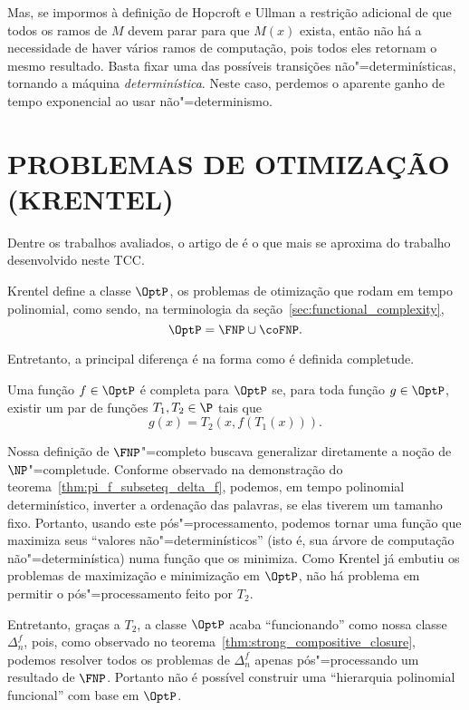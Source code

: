 Mas,
se impormos à definição de Hopcroft e Ullman a restrição adicional
de que todos os ramos de $M$ devem parar para que $M(x)$ exista,
então não há a necessidade de haver vários ramos de computação,
pois todos eles retornam o mesmo resultado.
Basta fixar uma das possíveis transições não"=determinísticas,
tornando a máquina \emph{determinística}.
Neste caso,
perdemos o aparente ganho de tempo exponencial ao usar não"=determinismo.

\section{PROBLEMAS DE OTIMIZAÇÃO (KRENTEL)}

Dentre os trabalhos avaliados,
o artigo de 
é o que mais se aproxima do trabalho desenvolvido neste TCC.

Krentel define a classe $\OptP$,
os problemas de otimização que rodam em tempo polinomial,
como sendo,
na terminologia da seção~\ref{sec:functional_complexity},
\begin{equation*}
    \OptP = \FNP \cup \coFNP.
\end{equation*}

Entretanto,
a principal diferença é na forma como é definida completude.
\begin{definition}
    Uma função $f \in \OptP$ é completa para $\OptP$
    se, para toda função $g \in \OptP$,
    existir um par de funções $T_1, T_2 \in \P$
    tais que
    \begin{equation*}
        g(x) = T_2( x, f(T_1(x)) ).
    \end{equation*}
\end{definition}

Nossa definição de $\FNP$"=completo
buscava generalizar diretamente a noção de $\NP$"=completude.
Conforme observado na demonstração do teorema~\ref{thm:pi_f_subseteq_delta_f},
podemos, em tempo polinomial determinístico,
inverter a ordenação das palavras, se elas tiverem um tamanho fixo.
Portanto,
usando este pós"=processamento,
podemos tornar uma função que maximiza seus ``valores não"=determinísticos''
(isto é, sua árvore de computação não"=determinística)
numa função que os minimiza.
Como Krentel já embutiu os problemas de maximização e minimização em $\OptP$,
não há problema em permitir o pós"=processamento feito por $T_2$.

Entretanto,
graças a $T_2$,
a classe $\OptP$ acaba ``funcionando'' como nossa classe $\Delta_n^f$,
pois,
como observado no teorema~\ref{thm:strong_compositive_closure},
podemos resolver todos os problemas de $\Delta_n^f$
apenas pós"=processando um resultado de $\FNP$.
Portanto não é possível construir uma ``hierarquia polinomial funcional''
com base em $\OptP$.

